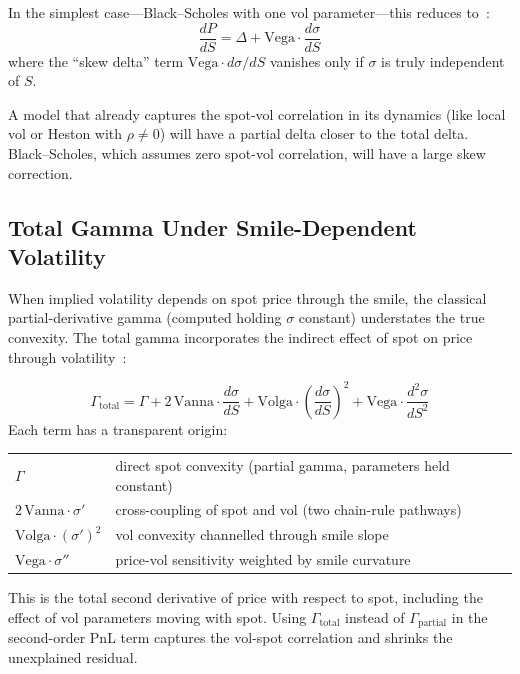 \documentclass[11pt,a4paper]{article}
\begin{document}
In the simplest case---Black--Scholes with one vol parameter---this reduces to~\cite{pnl_total_gamma,total_gamma}:
\begin{equation}\label{eq:total_delta_bs}
\frac{dP}{dS} = \Delta + \text{Vega} \cdot \frac{d\sigma}{dS}
\end{equation}
where the ``skew delta'' term $\text{Vega} \cdot d\sigma/dS$ vanishes only if $\sigma$ is truly independent of $S$.

A model that already captures the spot-vol correlation in its dynamics (like local vol or Heston with $\rho \neq 0$) will have a partial delta closer to the total delta.  Black--Scholes, which assumes zero spot-vol correlation, will have a large skew correction.

\subsection{Total Gamma Under Smile-Dependent Volatility}
\label{sec:total-greeks}

When implied volatility depends on spot price through the smile, the classical partial-derivative gamma (computed holding $\sigma$ constant) understates the true convexity.  The total gamma incorporates the indirect effect of spot on price through volatility~\cite{pnl_total_gamma,total_gamma}:

\begin{equation}\label{eq:total_gamma}
\boxed{\Gamma_{\text{total}} = \Gamma + 2\,\text{Vanna} \cdot \frac{d\sigma}{dS} + \text{Volga} \cdot \left(\frac{d\sigma}{dS}\right)^{\!2} + \text{Vega} \cdot \frac{d^2\sigma}{dS^2}}
\end{equation}
Each term has a transparent origin:
\begin{center}
\renewcommand{\arraystretch}{1.3}
\begin{tabular}{ll}
$\Gamma$ & direct spot convexity (partial gamma, parameters held constant) \\
$2\,\text{Vanna}\cdot\sigma'$ & cross-coupling of spot and vol (two chain-rule pathways) \\
$\text{Volga}\cdot(\sigma')^2$ & vol convexity channelled through smile slope \\
$\text{Vega}\cdot\sigma''$ & price-vol sensitivity weighted by smile curvature
\end{tabular}
\end{center}

\noindent This is the total second derivative of price with respect to spot, including the effect of vol parameters moving with spot.  Using $\Gamma_{\text{total}}$ instead of $\Gamma_{\text{partial}}$ in the second-order PnL term captures the vol-spot correlation and shrinks the unexplained residual.
\end{document}
